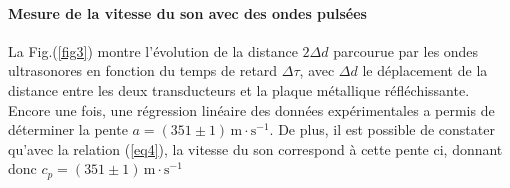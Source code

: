 \documentclass[a4paper, 12pt,oneside]{article}
\begin{document}
\paragraph{Mesure de la vitesse du son avec des ondes pulsées}

La Fig.(\ref{fig3}) montre l’évolution de la distance $2 \Delta d$ parcourue par les ondes ultrasonores en fonction du temps de retard $\Delta \tau$, avec $\Delta d$ le déplacement de la distance entre les deux transducteurs et la plaque métallique réfléchissante. Encore une fois, une régression linéaire des données expérimentales a permis de déterminer la pente $a = (351 \pm 1) \, \text{m} \cdot \text{s}^{-1}$. De plus, il est possible de constater qu'avec la relation (\ref{eq4}), la vitesse du son correspond à cette pente ci, donnant donc $c_p = (351 \pm 1) \, \text{m} \cdot \text{s}^{-1}$
\end{document}
